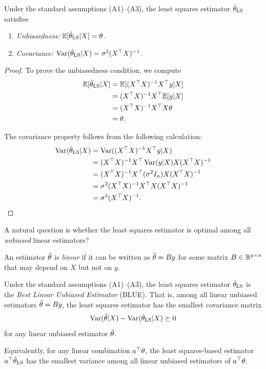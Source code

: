 \begin{theorem}\label{th:ols_properties}
Under the standard assumptions (A1)--(A3), the least squares estimator $\hat{\theta}_{\text{LS}}$ satisfies
\begin{enumerate}
  \item[(i)] {\em Unbiasedness:} $\mathbb{E}[\hat{\theta}_{\text{LS}} | X] = \theta$.
  \item[(ii)] {\em Covariance:} $\operatorname{Var}(\hat{\theta}_{\text{LS}} | X) = \sigma^2(X^\top X)^{-1}$.
\end{enumerate}
\end{theorem}

\begin{proof}
To prove the unbiasedness condition, we compute
\begin{align*}
  \mathbb{E}[\hat{\theta}_{\text{LS}} | X]
  &= \mathbb{E}[(X^\top X)^{-1}X^\top y | X]\\
  &= (X^\top X)^{-1}X^\top\mathbb{E}[y | X]\\
  &= (X^\top X)^{-1}X^\top X\theta\\
  &= \theta.
\end{align*}

The covariance property follows from the following calculation:
\begin{align*}
  \operatorname{Var}(\hat{\theta}_{\text{LS}} | X)
  &= \operatorname{Var}((X^\top X)^{-1}X^\top y | X)\\
  &= (X^\top X)^{-1}X^\top \operatorname{Var}(y | X) X(X^\top X)^{-1}\\
  &= (X^\top X)^{-1}X^\top (\sigma^2I_n) X(X^\top X)^{-1}\\
  &= \sigma^2(X^\top X)^{-1}X^\top X(X^\top X)^{-1}\\
  &= \sigma^2(X^\top X)^{-1}.
\end{align*}

\end{proof}

A natural question is whether the least squares estimator is optimal among all \emph{unbiased} linear estimators?

\begin{definition}\label{def:linear_estimator}
An estimator $\tilde{\theta}$ is \emph{linear} if it can be written as $\tilde{\theta} = B y$
for some matrix $B \in \mathbb{R}^{p \times n}$ that may depend on $X$ but not on $y$.
\end{definition}



\begin{theorem}\label{th:gauss_markov}
Under the standard assumptions (A1)--(A3), the least squares estimator $\hat{\theta}_{\text{LS}}$ is the 
{\em Best Linear Unbiased Estimator} (BLUE). That is, among all linear unbiased 
estimators $\tilde{\theta} = By$, the least squares estimator has the smallest 
covariance matrix
$$\operatorname{Var}(\tilde{\theta} | X ) - \operatorname{Var}(\hat{\theta}_{\text{LS}} | X ) \succeq 0$$
for any linear unbiased estimator $\tilde{\theta}$.

Equivalently, for any linear combination $a^\top\theta$, the least squares-based estimator 
$a^\top\hat{\theta}_{\text{LS}}$ has the smallest variance among all linear unbiased 
estimators of $a^\top\theta$.
\end{theorem}


